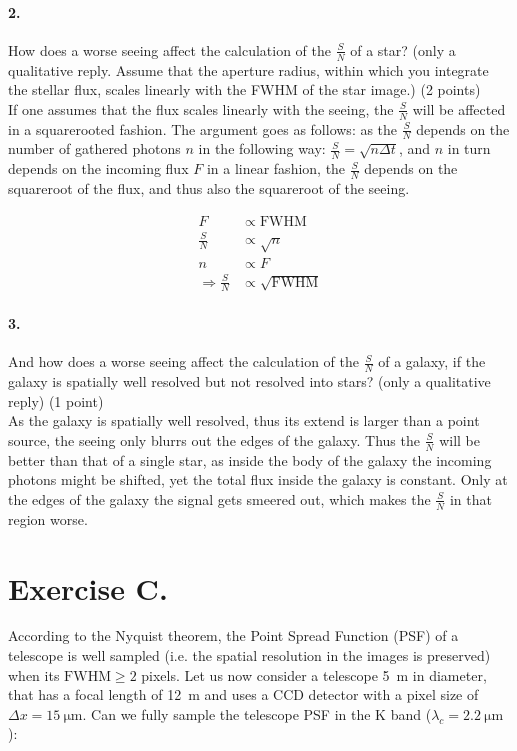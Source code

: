 \documentclass[11pt,a4paper,twoside]{article}
\newcommand{\SNR}{\ensuremath{\frac{S}{N}} }
\begin{document}
\paragraph{2.} How does a worse seeing affect the calculation of the \SNR of a
star? (only a qualitative reply. Assume that the aperture radius, within which
you integrate the stellar flux, scales linearly with the FWHM of the star
image.) (2 points) \\

If one assumes that the flux scales linearly with the seeing, the \SNR will
be affected in a squarerooted fashion. The argument goes as follows:
as the \SNR depends on the number of gathered photons $n$ in the following way:
$\SNR = \sqrt{n\Delta t}$, and $n$ in turn depends on the incoming flux $F$ in 
a linear fashion, the \SNR depends on the squareroot of the flux,  and thus
also the squareroot of the seeing.

\begin{align}
F       &\propto \mathrm{FWHM}    \\
\SNR    &\propto \sqrt{n}      \\
n       &\propto F              \\
\Rightarrow 
\SNR    &\propto \sqrt{\mathrm{FWHM}}
\end{align}

\paragraph{3.} And how does a worse seeing affect the calculation of the \SNR
of a galaxy, if the galaxy is spatially well resolved but not resolved into
stars? (only a qualitative reply) (1 point) \\

As the galaxy is spatially well resolved, thus its extend is larger than a
point source, the seeing only blurrs out the edges of the galaxy. Thus the
\SNR will be better than that of a single star, as inside the body of the galaxy
the incoming photons might be shifted, yet the total flux inside the galaxy is
constant. Only at the edges of the galaxy the signal gets smeered out, which
makes the \SNR in that region worse. \\


\section*{Exercise C.}
According to the Nyquist theorem, the Point Spread Function (PSF) of a
telescope is well sampled (i.e. the spatial resolution in the images is
preserved) when its $\mathrm{FWHM} \geq 2$ pixels. Let us now consider a
telescope \SI{5}{\meter} in diameter, that has a focal length of
\SI{12}{\meter} and uses a CCD detector with a pixel size of $\Delta x =
\SI{15}{\micro\meter}$. Can we fully sample the telescope PSF in the K band
($\lambda_c = \SI{2.2}{\micro\meter}$):
\end{document}
